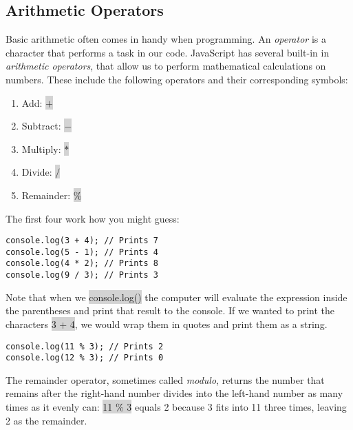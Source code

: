 \documentclass[11pt]{article}
\begin{document}
\subsection{Arithmetic Operators}
Basic arithmetic often comes in handy when programming. An \textit{operator} is a character that performs a task in our code. JavaScript has several built-in in \textit{arithmetic operators}, that allow us to perform mathematical calculations on numbers. These include the following operators and their corresponding symbols:
\begin{enumerate}[leftmargin = *]
\item Add: \colorbox{lightgray}{$+$} 
\item Subtract: \colorbox{lightgray}{$-$}
\item Multiply: \colorbox{lightgray}{$*$}
\item Divide: \colorbox{lightgray}{$/$}
\item Remainder: \colorbox{lightgray}{$\%$}
\end{enumerate}
The first four work how you might guess:
\begin{lstlisting}
console.log(3 + 4); // Prints 7
console.log(5 - 1); // Prints 4
console.log(4 * 2); // Prints 8
console.log(9 / 3); // Prints 3
\end{lstlisting}
Note that when we \colorbox{lightgray}{console.log()} the computer will evaluate the expression inside the parentheses and print that result to the console. If we wanted to print the characters \colorbox{lightgray}{3 + 4}, we would wrap them in quotes and print them as a string.
\begin{lstlisting}
console.log(11 % 3); // Prints 2
console.log(12 % 3); // Prints 0 
\end{lstlisting}
The remainder operator, sometimes called \textit{modulo}, returns the number that remains after the right-hand number divides into the left-hand number as many times as it evenly can: \colorbox{lightgray}{11 \% 3} equals 2 because 3 fits into 11 three times, leaving 2 as the remainder.
\end{document}
